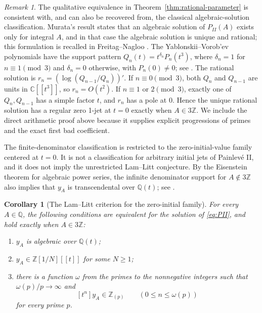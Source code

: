 \documentclass[11pt,a4paper,reqno]{amsart}
\newtheorem{corollary}[theorem]{Corollary}
\theoremstyle{definition}
\theoremstyle{remark}
\newtheorem{remark}[theorem]{Remark}
\newcommand{\Q}{\mathbb Q}
\newcommand{\Z}{\mathbb Z}
\begin{document}
\begin{remark}
The qualitative equivalence in Theorem~\ref{thm:rational-parameter} is consistent with, and can also be recovered from, the classical algebraic-solution classification. Murata's result states that an algebraic solution of $P_{II}(A)$ exists only for integral $A$, and in that case the algebraic solution is unique and rational; this formulation is recalled in Freitag--Nagloo \cite[Section~3]{FreitagNagloo}. The Yablonskii--Vorob'ev polynomials have the support pattern $Q_n(t)=t^{\delta_n}P_n(t^3)$, where $\delta_n=1$ for $n\equiv1\pmod3$ and $\delta_n=0$ otherwise, with $P_n(0)\ne0$; see \cite{KanekoOchiai}. The rational solution is $r_n=(\log(Q_{n-1}/Q_n))'$. If $n\equiv0\pmod3$, both $Q_n$ and $Q_{n-1}$ are units in $\mathbb C[[t^3]]$, so $r_n=O(t^2)$. If $n\equiv1$ or $2\pmod3$, exactly one of $Q_n,Q_{n-1}$ has a simple factor $t$, and $r_n$ has a pole at $0$. Hence the unique rational solution has a regular zero 1-jet at $t=0$ exactly when $A\in3\mathbb Z$. We include the direct arithmetic proof above because it supplies explicit progressions of primes and the exact first bad coefficient.

The finite-denominator classification is restricted to the zero-initial-value family centered at $t=0$. It is not a classification for arbitrary initial jets of Painlev\'e II, and it does not imply the unrestricted Lam--Litt conjecture. By the Eisenstein theorem for algebraic power series, the infinite denominator support for $A\notin3\Z$ also implies that $y_A$ is transcendental over $\Q(t)$; see \cite{BiluBorichev}.
\end{remark}

\begin{corollary}[The Lam--Litt criterion for the zero-initial family]\label{cor:LL}
For every $A\in\Q$, the following conditions are equivalent for the solution of \eqref{eq:PII}, and hold exactly when $A\in3\Z$:
\begin{enumerate}[label=(\roman*)]
\item $y_A$ is algebraic over $\Q(t)$;
\item $y_A\in\Z[1/N][[t]]$ for some $N\ge1$;
\item there is a function $\omega$ from the primes to the nonnegative integers such that $\omega(p)/p\to\infty$ and
\[
 [t^n]y_A\in\Z_{(p)}\qquad(0\le n\le\omega(p))
\]
for every prime $p$.
\end{enumerate}
\end{corollary}
\end{document}
